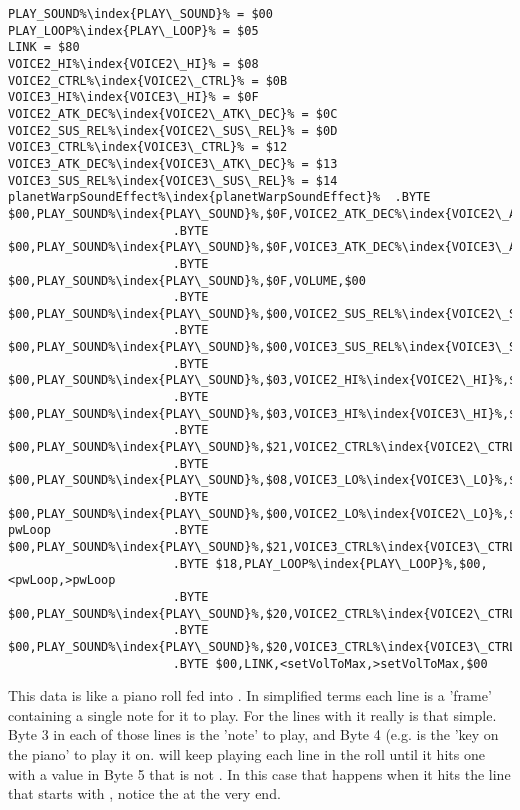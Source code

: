 \begin{lstlisting}[escapechar=\%]
PLAY_SOUND%\index{PLAY\_SOUND}% = $00
PLAY_LOOP%\index{PLAY\_LOOP}% = $05
LINK = $80
VOICE2_HI%\index{VOICE2\_HI}% = $08
VOICE2_CTRL%\index{VOICE2\_CTRL}% = $0B
VOICE3_HI%\index{VOICE3\_HI}% = $0F
VOICE2_ATK_DEC%\index{VOICE2\_ATK\_DEC}% = $0C
VOICE2_SUS_REL%\index{VOICE2\_SUS\_REL}% = $0D
VOICE3_CTRL%\index{VOICE3\_CTRL}% = $12
VOICE3_ATK_DEC%\index{VOICE3\_ATK\_DEC}% = $13
VOICE3_SUS_REL%\index{VOICE3\_SUS\_REL}% = $14
planetWarpSoundEffect%\index{planetWarpSoundEffect}%  .BYTE $00,PLAY_SOUND%\index{PLAY\_SOUND}%,$0F,VOICE2_ATK_DEC%\index{VOICE2\_ATK\_DEC}%,$00
                       .BYTE $00,PLAY_SOUND%\index{PLAY\_SOUND}%,$0F,VOICE3_ATK_DEC%\index{VOICE3\_ATK\_DEC}%,$00
                       .BYTE $00,PLAY_SOUND%\index{PLAY\_SOUND}%,$0F,VOLUME,$00
                       .BYTE $00,PLAY_SOUND%\index{PLAY\_SOUND}%,$00,VOICE2_SUS_REL%\index{VOICE2\_SUS\_REL}%,$00
                       .BYTE $00,PLAY_SOUND%\index{PLAY\_SOUND}%,$00,VOICE3_SUS_REL%\index{VOICE3\_SUS\_REL}%,$00
                       .BYTE $00,PLAY_SOUND%\index{PLAY\_SOUND}%,$03,VOICE2_HI%\index{VOICE2\_HI}%,$00
                       .BYTE $00,PLAY_SOUND%\index{PLAY\_SOUND}%,$03,VOICE3_HI%\index{VOICE3\_HI}%,$00
                       .BYTE $00,PLAY_SOUND%\index{PLAY\_SOUND}%,$21,VOICE2_CTRL%\index{VOICE2\_CTRL}%,$00
                       .BYTE $00,PLAY_SOUND%\index{PLAY\_SOUND}%,$08,VOICE3_LO%\index{VOICE3\_LO}%,$00
                       .BYTE $00,PLAY_SOUND%\index{PLAY\_SOUND}%,$00,VOICE2_LO%\index{VOICE2\_LO}%,$00
pwLoop                 .BYTE $00,PLAY_SOUND%\index{PLAY\_SOUND}%,$21,VOICE3_CTRL%\index{VOICE3\_CTRL}%,$01
                       .BYTE $18,PLAY_LOOP%\index{PLAY\_LOOP}%,$00,<pwLoop,>pwLoop
                       .BYTE $00,PLAY_SOUND%\index{PLAY\_SOUND}%,$20,VOICE2_CTRL%\index{VOICE2\_CTRL}%,$00
                       .BYTE $00,PLAY_SOUND%\index{PLAY\_SOUND}%,$20,VOICE3_CTRL%\index{VOICE3\_CTRL}%,$00
                       .BYTE $00,LINK,<setVolToMax,>setVolToMax,$00
\end{lstlisting}

This data is like a piano roll fed into . In simplified terms each line is a 'frame' containing
a single note for it to play. For the lines with  it really is that simple. Byte 3 in each of those lines
is the 'note' to play, and Byte 4 (e.g.  is the 'key on the piano' to play it on. 
will keep playing each line in the roll until it hits one with a value in Byte 5 that is not . In this case that
happens when it hits the line that starts with , notice the  at the very end.

